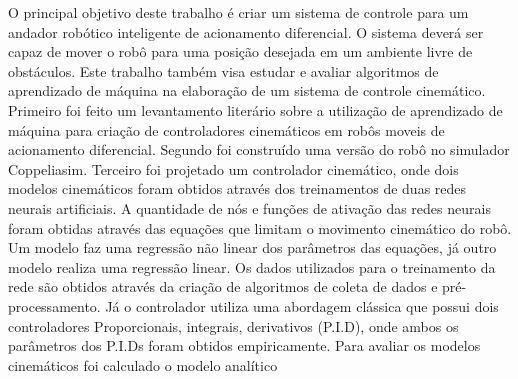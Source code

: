 %
%

O principal objetivo deste trabalho é criar um  sistema de
controle para um andador robótico inteligente de acionamento diferencial.
O sistema deverá ser capaz de
mover o robô para uma posição desejada em um ambiente livre de obstáculos.
Este trabalho também visa estudar e avaliar algoritmos de aprendizado
de máquina na elaboração de um sistema de controle cinemático.
Primeiro foi feito um levantamento literário sobre a utilização de
aprendizado de máquina para criação de controladores cinemáticos em robôs moveis de acionamento
diferencial. Segundo foi construído uma versão do robô no simulador Coppeliasim.
Terceiro foi projetado um controlador cinemático, onde dois modelos
cinemáticos foram obtidos através dos  treinamentos de duas
redes neurais artificiais. A quantidade de nós e funções de ativação
das redes neurais foram obtidas através das equações que limitam o movimento
cinemático do robô. Um modelo faz uma regressão não linear dos
parâmetros das equações, já outro modelo realiza uma regressão linear.
Os dados utilizados para o treinamento da rede são obtidos
através da criação de  algoritmos de coleta de dados e pré-processamento.
Já o controlador utiliza uma abordagem
clássica que possui  dois controladores
Proporcionais, integrais, derivativos (P.I.D),
onde ambos os parâmetros dos P.I.Ds foram obtidos empiricamente.
Para avaliar os modelos cinemáticos foi calculado o modelo analítico
